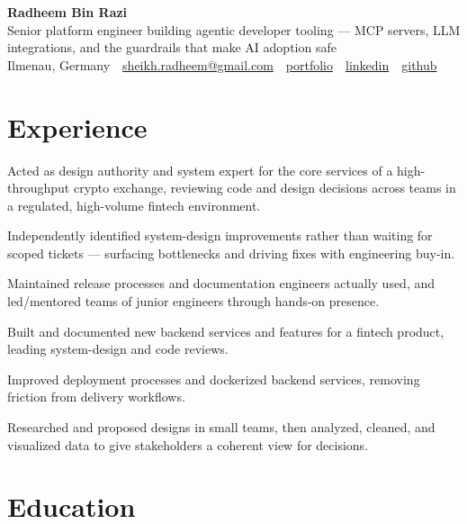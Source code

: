\documentclass[11pt,a4paper]{resume}
\makeatletter
\newcommand{\Portfolio}{https://radheem.github.io/my-cv}
\newcommand{\PortfolioText}{portfolio}
\newcommand{\GitHub}{https://github.com/radheem}
\newcommand{\LinkedIn}{https://www.linkedin.com/in/radheem-razi}
\newcommand{\Email}{sheikh.radheem@gmail.com}
\makeatother
\begin{document}
\begin{center}
  {\huge\bfseries Radheem Bin Razi}\\[3pt]
  {\large Senior platform engineer building agentic developer tooling — MCP servers, LLM integrations, and the guardrails that make AI adoption safe}\\[6pt]
  \small
  Ilmenau, Germany \,\textbar\,
  \href{mailto:\Email}{\Email} \,\textbar\,
  \href{\Portfolio}{\PortfolioText} \,\textbar\,
  \href{\LinkedIn}{linkedin} \,\textbar\,
  \href{\GitHub}{github}
\end{center}
\vspace{2pt}

\section{Experience}

\bullets
  \item Acted as design authority and system expert for the core services of a high-throughput crypto exchange, reviewing code and design decisions across teams in a regulated, high-volume fintech environment.
  \item Independently identified system-design improvements rather than waiting for scoped tickets — surfacing bottlenecks and driving fixes with engineering buy-in.
  \item Maintained release processes and documentation engineers actually used, and led/mentored teams of junior engineers through hands-on presence.
\bulletsend
\vspace{3pt}
\bullets
  \item Built and documented new backend services and features for a fintech product, leading system-design and code reviews.
  \item Improved deployment processes and dockerized backend services, removing friction from delivery workflows.
\bulletsend
\vspace{3pt}
\bullets
  \item Researched and proposed designs in small teams, then analyzed, cleaned, and visualized data to give stakeholders a coherent view for decisions.
\bulletsend
\vspace{3pt}

\section{Education}
\end{document}
